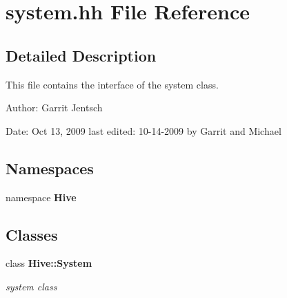 \section{system.hh File Reference}
\label{system_8hh}


\subsection{Detailed Description}
This file contains the interface of the system class.

\begin{Desc}
\item[Author:]Garrit Jentsch\end{Desc}
\begin{Desc}
\item[Date:]Oct 13, 2009 last edited: 10-14-2009 by Garrit and Michael \end{Desc}


\subsection*{Namespaces}
\begin{CompactItemize}
\item 
namespace {\bf Hive}
\end{CompactItemize}
\subsection*{Classes}
\begin{CompactItemize}
\item 
class {\bf Hive::System}
\begin{CompactList}\small\item\em system class \item\end{CompactList}\end{CompactItemize}
